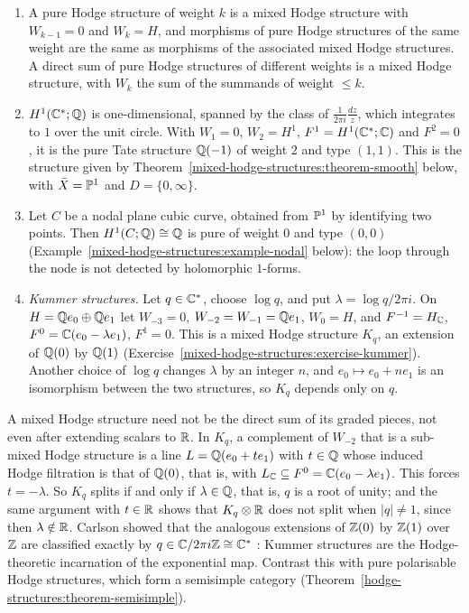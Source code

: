 \begin{example}\label{mixed-hodge-structures:example-mhs}
\begin{enumerate}
\item A pure Hodge structure of weight $k$ is a mixed Hodge structure with $W_{k-1} = 0$ and $W_k = H$, and morphisms of pure Hodge structures of the same weight are the same as morphisms of the
associated mixed Hodge structures. A direct sum of pure Hodge structures of different weights is a mixed Hodge structure, with $W_k$ the sum of the summands of weight $\leq k$.
\item $H^1(\mathbb{C}^*; \mathbb{Q})$ is one-dimensional, spanned by the class of $\frac{1}{2\pi i}\frac{dz}{z}$, which integrates to $1$ over the unit circle. With $W_1 = 0$, $W_2 = H^1$, $F^1 = H^1(\mathbb{C}^*; \mathbb{C})$ and
$F^2 = 0$, it is the pure Tate structure $\mathbb{Q}(-1)$ of weight $2$ and type $(1,1)$. This is the structure given by Theorem~\ref{mixed-hodge-structures:theorem-smooth} below, with $\bar X = \mathbb{P}^1$ and $D = \{0, \infty\}$.
\item Let $C$ be a nodal plane cubic curve, obtained from $\mathbb{P}^1$ by identifying two points. Then $H^1(C; \mathbb{Q}) \cong \mathbb{Q}$ is pure of weight $0$ and type $(0,0)$
(Example~\ref{mixed-hodge-structures:example-nodal} below): the loop through the node is not detected by holomorphic $1$-forms.
\item \emph{Kummer structures.} Let $q \in \mathbb{C}^*$, choose $\log q$, and put $\lambda = \log q/2\pi i$. On $H = \mathbb{Q} e_0 \oplus \mathbb{Q} e_1$ let $W_{-3} = 0$, $W_{-2} = W_{-1} = \mathbb{Q} e_1$, $W_0 = H$, and
$F^{-1} = H_{\mathbb{C}}$, $F^0 = \mathbb{C}(e_0 - \lambda e_1)$, $F^1 = 0$. This is a mixed Hodge structure $K_q$, an extension of $\mathbb{Q}(0)$ by $\mathbb{Q}(1)$ (Exercise~\ref{mixed-hodge-structures:exercise-kummer}). Another choice
of $\log q$ changes $\lambda$ by an integer $n$, and $e_0 \mapsto e_0 + ne_1$ is an isomorphism between the two structures, so $K_q$ depends only on $q$.
\end{enumerate}
\end{example}

\begin{counterexample}\label{mixed-hodge-structures:counterexample-no-splitting}
A mixed Hodge structure need not be the direct sum of its graded pieces, not even after extending scalars to $\mathbb{R}$. In $K_q$, a complement of $W_{-2}$ that is a sub-mixed Hodge structure is a line
$L = \mathbb{Q}(e_0 + te_1)$ with $t \in \mathbb{Q}$ whose induced Hodge filtration is that of $\mathbb{Q}(0)$, that is, with $L_{\mathbb{C}} \subseteq F^0 = \mathbb{C}(e_0 - \lambda e_1)$. This forces $t = -\lambda$. So $K_q$ splits if and
only if $\lambda \in \mathbb{Q}$, that is, $q$ is a root of unity; and the same argument with $t \in \mathbb{R}$ shows that $K_q \otimes \mathbb{R}$ does not split when $|q| \neq 1$, since then $\lambda \notin \mathbb{R}$. Carlson showed
that the analogous extensions of $\mathbb{Z}(0)$ by $\mathbb{Z}(1)$ over $\mathbb{Z}$ are classified exactly by $q \in \mathbb{C}/2\pi i\mathbb{Z} \cong \mathbb{C}^*$ \cite{carlson-1980}: Kummer structures are the Hodge-theoretic incarnation of
the exponential map. Contrast this with pure polarisable Hodge structures, which form a semisimple category (Theorem~\ref{hodge-structures:theorem-semisimple}).
\end{counterexample}

